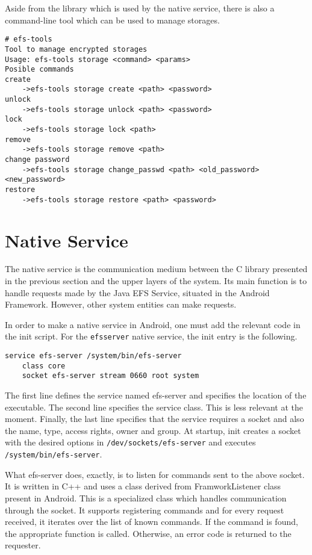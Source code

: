 Aside from the library which is used by the native service, there is also a command-line tool which can be used to manage storages. 

\begin{lstlisting}[numbers=none, basicstyle=\footnotesize, caption=efs-tools binary, label=lst:efs-tools]
# efs-tools                                              
Tool to manage encrypted storages
Usage: efs-tools storage <command> <params>
Posible commands
create
	->efs-tools storage create <path> <password>
unlock
	->efs-tools storage unlock <path> <password>
lock
	->efs-tools storage lock <path>
remove
	->efs-tools storage remove <path>
change password
	->efs-tools storage change_passwd <path> <old_password> <new_password>
restore
	->efs-tools storage restore <path> <password>
\end{lstlisting}

\section{Native Service}
\label{sec:native-service-multi-user}

The native service is the communication medium between the C library presented in the previous section and the upper layers of the system. Its main function is to handle requests made by the Java EFS Service, situated in the Android Framework. However, other system entities can make requests.

In order to make a native service in Android, one must add the relevant code in the init script.
For the \texttt{efsserver} native service, the init entry is the following.

\begin{lstlisting}[numbers=none, caption=efsserver init entry, label=lst:efsserver-init]
service efs-server /system/bin/efs-server
    class core
    socket efs-server stream 0660 root system
\end{lstlisting}

The first line defines the service named efs-server and specifies the location of the executable.
The second line specifies the service class. This is less relevant at the moment. Finally, the last line specifies that the service requires a socket and also the name, type, access rights, owner and group. At startup, init creates a socket with the desired options in \texttt{/dev/sockets/efs-server} and executes \texttt{/system/bin/efs-server}.

What efs-server does, exactly, is to listen for commands sent to the above socket. It is written in C++ and uses a class derived from FramworkListener class present in Android. This is a specialized class which handles communication through the socket. It supports registering commands and for every request received, it iterates over the list of known commands. If the command is found, the appropriate function is called. Otherwise, an error code is returned to the requester. 

